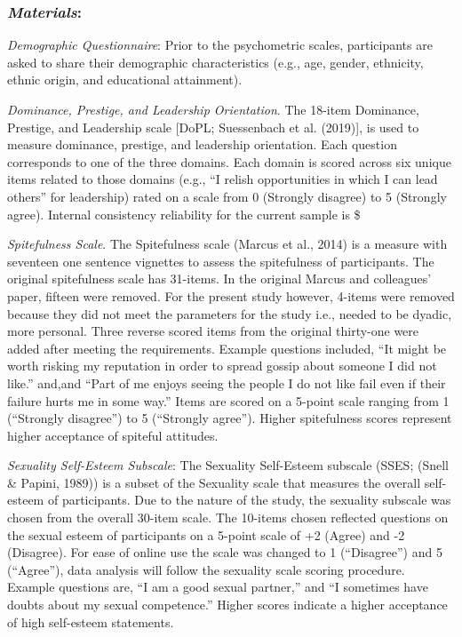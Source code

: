 \documentclass[
  english,
  a4paper]{apa7}
\begin{document}
\hypertarget{materials}{%
\subsubsection{\texorpdfstring{\emph{Materials}:}{Materials:}}\label{materials}}

\emph{Demographic Questionnaire}:
Prior to the psychometric scales, participants are asked to share their demographic characteristics (e.g., age, gender, ethnicity, ethnic origin, and educational attainment).

\emph{Dominance, Prestige, and Leadership Orientation}.
The 18-item Dominance, Prestige, and Leadership scale {[}DoPL; Suessenbach et al. (2019){]}, is used to measure dominance, prestige, and leadership orientation. Each question corresponds to one of the three domains. Each domain is scored across six unique items related to those domains (e.g., ``I relish opportunities in which I can lead others'' for leadership) rated on a scale from 0 (Strongly disagree) to 5 (Strongly agree). Internal consistency reliability for the current sample is \$

\emph{Spitefulness Scale}.
The Spitefulness scale (Marcus et al., 2014) is a measure with seventeen one sentence vignettes to assess the spitefulness of participants. The original spitefulness scale has 31-items. In the original Marcus and colleagues' paper, fifteen were removed. For the present study however, 4-items were removed because they did not meet the parameters for the study i.e., needed to be dyadic, more personal. Three reverse scored items from the original thirty-one were added after meeting the requirements. Example questions included, ``It might be worth risking my reputation in order to spread gossip about someone I did not like.'' and,and ``Part of me enjoys seeing the people I do not like fail even if their failure hurts me in some way.'' Items are scored on a 5-point scale ranging from 1 (``Strongly disagree'') to 5 (``Strongly agree''). Higher spitefulness scores represent higher acceptance of spiteful attitudes.

\emph{Sexuality Self-Esteem Subscale}:
The Sexuality Self-Esteem subscale (SSES; (Snell \& Papini, 1989)) is a subset of the Sexuality scale that measures the overall self-esteem of participants. Due to the nature of the study, the sexuality subscale was chosen from the overall 30-item scale. The 10-items chosen reflected questions on the sexual esteem of participants on a 5-point scale of +2 (Agree) and -2 (Disagree). For ease of online use the scale was changed to 1 (``Disagree'') and 5 (``Agree''), data analysis will follow the sexuality scale scoring procedure. Example questions are, ``I am a good sexual partner,'' and ``I sometimes have doubts about my sexual competence.'' Higher scores indicate a higher acceptance of high self-esteem statements.
\end{document}
